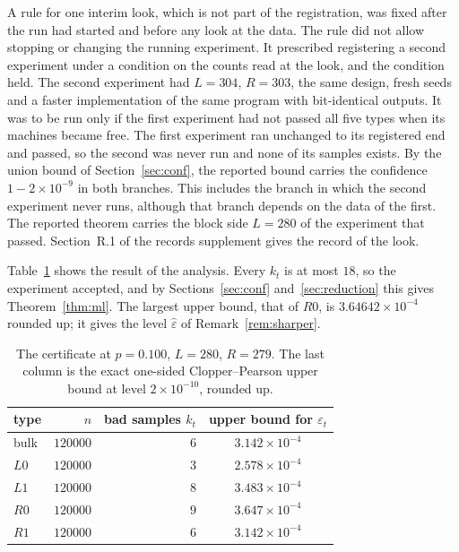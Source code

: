 \documentclass[11pt]{amsart}
\theoremstyle{definition}
\theoremstyle{remark}
\numberwithin{equation}{section}
\begin{document}
A rule for one interim look, which is not part of the registration, was fixed after the run had started and before any look at the data. The rule did not allow stopping or changing the running experiment. It prescribed registering a second experiment under a condition on the counts read at the look, and the condition held. The second experiment had $L=304$, $R=303$, the same design, fresh seeds and a faster implementation of the same program with bit-identical outputs. It was to be run only if the first experiment had not passed all five types when its machines became free. The first experiment ran unchanged to its registered end and passed, so the second was never run and none of its samples exists. By the union bound of Section~\ref{sec:conf}, the reported bound carries the confidence $1-2\times10^{-9}$ in both branches. This includes the branch in which the second experiment never runs, although that branch depends on the data of the first. The reported theorem carries the block side $L=280$ of the experiment that passed. Section~R.1 of the records supplement gives the record of the look.

Table~\ref{tab:cert-counts} shows the result of the analysis. Every $k_t$ is at most $18$, so the experiment accepted, and by Sections~\ref{sec:conf} and~\ref{sec:reduction} this gives Theorem~\ref{thm:ml}. The largest upper bound, that of $R0$, is $3.64642\times10^{-4}$ rounded up; it gives the level $\hat\varepsilon$ of Remark~\ref{rem:sharper}.

\begin{table}[ht]
\centering
\begin{tabular}{@{}lrrc@{}}
\toprule
type & $n$ & bad samples $k_t$ & upper bound for $\varepsilon_t$ \\
\midrule
bulk & $120000$ & $6$ & $3.142\times10^{-4}$ \\
$L0$ & $120000$ & $3$ & $2.578\times10^{-4}$ \\
$L1$ & $120000$ & $8$ & $3.483\times10^{-4}$ \\
$R0$ & $120000$ & $9$ & $3.647\times10^{-4}$ \\
$R1$ & $120000$ & $6$ & $3.142\times10^{-4}$ \\
\bottomrule
\end{tabular}
\caption{The certificate at $p=0.100$, $L=280$, $R=279$. The last column is the exact one-sided Clopper--Pearson upper bound at level $2\times10^{-10}$, rounded up.}
\label{tab:cert-counts}
\end{table}
\end{document}
